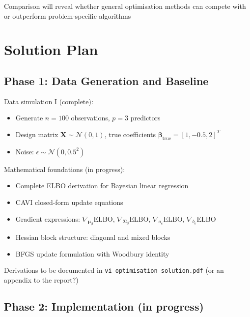 \documentclass[11pt]{article}
\newcommand{\N}{\mathcal{N}}
\newcommand{\ELBO}{\text{ELBO}}
\begin{document}
Comparison will reveal whether general optimisation methods can compete with or outperform problem-specific algorithms

\section*{Solution Plan}

\subsection*{Phase 1: Data Generation and Baseline}

Data simulation I (complete):
\begin{itemize}
\item Generate $n = 100$ observations, $p = 3$ predictors
\item Design matrix $\bm{X} \sim \N(0, 1)$, true coefficients $\bm{\beta}_{\text{true}} = [1, -0.5, 2]^T$
\item Noise: $\epsilon \sim \N(0, 0.5^2)$
\end{itemize}

Mathematical foundations (in progress):
\begin{itemize}
\item Complete ELBO derivation for Bayesian linear regression
\item CAVI closed-form update equations
\item Gradient expressions: $\nabla_{\bm{\mu}_\beta} \ELBO$, $\nabla_{\bm{\Sigma}_\beta} \ELBO$, $\nabla_{a_e} \ELBO$, $\nabla_{b_e} \ELBO$
\item Hessian block structure: diagonal and mixed blocks
\item BFGS update formulation with Woodbury identity
\end{itemize}

Derivations to be documented in \texttt{vi\_optimisation\_solution.pdf} (or an appendix to the report?)

\subsection*{Phase 2: Implementation (in progress)}
\end{document}
